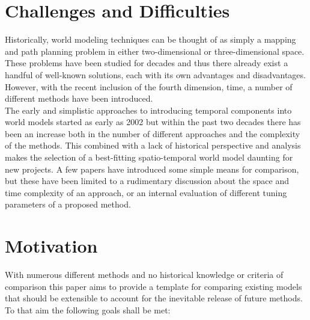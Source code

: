   \section{ Challenges and Difficulties }

  Historically, world modeling techniques can be thought of as simply a mapping
  and path planning problem in either two-dimensional or three-dimensional space.
  These problems have been studied for decades and thus there already exist a
  handful of well-known solutions, each with its own advantages and
  disadvantages. However, with the recent inclusion of the fourth
  dimension, time, a number of different methods have been introduced. \\

  The early and simplistic approaches to introducing temporal components into
  world models started as early as 2002 \cite{Arbuckle2002} but within the past
  two decades there has been an increase both in the number of different
  approaches and the complexity of the methods.
  This combined with a lack of historical perspective and analysis makes
  the selection of a best-fitting spatio-temporal world model daunting for
  new projects. A few papers have introduced some simple means
  for comparison, but these have been limited to a rudimentary discussion about the
  space and time complexity of an approach, or an internal evaluation of
  different tuning parameters of a proposed method. \\


  \section{ Motivation }
  With numerous different methods and no historical knowledge or criteria of comparison
  this paper aims to provide a template for comparing existing models that should
  be extensible to account for the inevitable release of future methods. To that
  aim the following goals shall be met:

